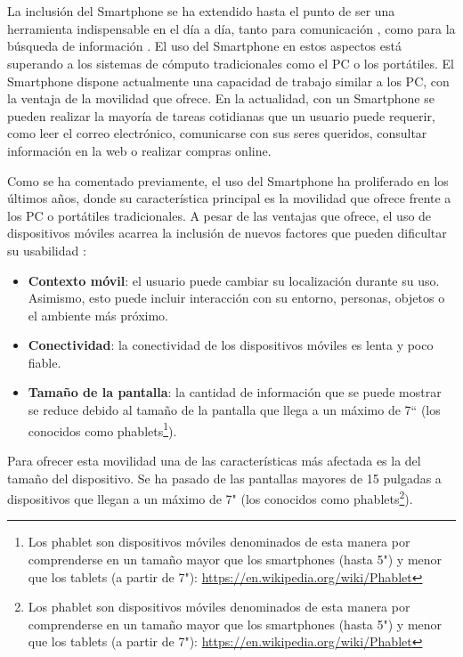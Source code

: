 \chapter{\introduction}


La inclusión del Smartphone se ha extendido hasta el punto de ser una herramienta indispensable en el día a día, tanto para comunicación \cite{Montag2015}, como para la búsqueda de información \cite{Wang2016}. El uso del Smartphone en estos aspectos está superando a los sistemas de cómputo tradicionales como el PC o los portátiles. El Smartphone dispone actualmente una capacidad de trabajo similar a los PC, con la ventaja de la movilidad que ofrece. En la actualidad, con un Smartphone se pueden realizar la mayoría de tareas cotidianas que un usuario puede requerir, como leer el correo electrónico, comunicarse con sus seres queridos, consultar información en la web o realizar compras online.

Como se ha comentado previamente, el uso del Smartphone ha proliferado en los últimos años, donde su característica principal es la movilidad que ofrece frente a los PC o portátiles tradicionales. A pesar de las ventajas que ofrece, el uso de dispositivos móviles acarrea la inclusión de nuevos factores que pueden dificultar su usabilidad \cite{zhang2005challenges}:
\begin{itemize}
	\item \textbf{Contexto móvil}: el usuario puede cambiar su localización durante su uso. Asimismo, esto puede incluir interacción con su entorno, personas, objetos o el ambiente más próximo.
	\item \textbf{Conectividad}: la conectividad de los dispositivos móviles es lenta y poco fiable.
	\item \textbf{Tamaño de la pantalla}: la cantidad de información que se puede mostrar se reduce debido al tamaño de la pantalla que llega a un máximo de 7`` (los conocidos como phablets\footnote{Los phablet son dispositivos móviles denominados de esta manera por comprenderse en un tamaño mayor que los smartphones (hasta 5") y menor que los tablets (a partir de 7"): \url{https://en.wikipedia.org/wiki/Phablet}}).
	
\end{itemize}

Para ofrecer esta movilidad una de las características más afectada es la del tamaño del dispositivo. Se ha pasado de las pantallas mayores de 15 pulgadas a dispositivos que llegan a un máximo de 7"  (los conocidos como phablets\footnote{Los phablet son dispositivos móviles denominados de esta manera por comprenderse en un tamaño mayor que los smartphones (hasta 5") y menor que los tablets (a partir de 7"): \url{https://en.wikipedia.org/wiki/Phablet}}).

